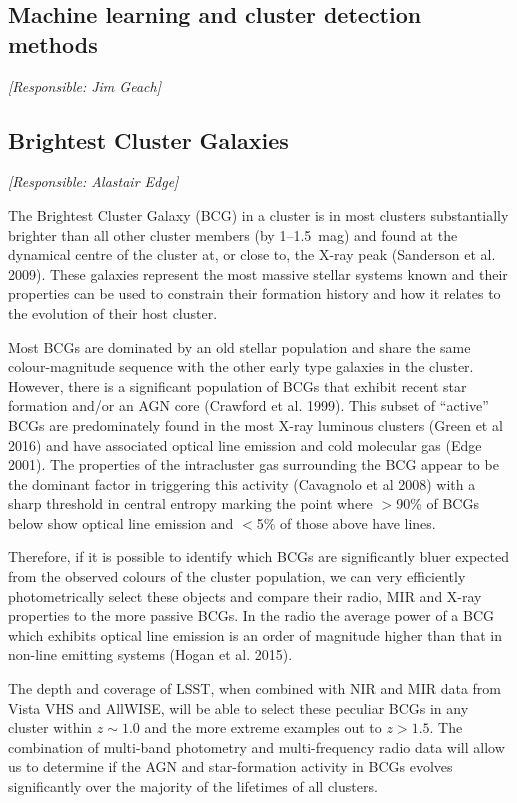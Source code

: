\documentclass[a4paper,11pt]{article}
\begin{document}
\subsection{Machine learning and cluster detection methods}

{\it [Responsible: Jim Geach]}

\subsection{Brightest Cluster Galaxies}

{\it [Responsible: Alastair Edge]}

\noindent
The Brightest Cluster Galaxy (BCG) in a cluster is in most
clusters substantially brighter than all other cluster
members (by 1--1.5~mag) and found at the dynamical centre
of the cluster at, or close to, the X-ray peak (Sanderson
et al. 2009). These galaxies represent the most massive 
stellar systems known and their properties can be used
to constrain their formation history and how it relates
to the evolution of their host cluster.

Most BCGs are dominated by an old stellar population
and share the same colour-magnitude sequence with the
other early type galaxies in the cluster. However, there
is a significant population of BCGs that exhibit recent
star formation and/or an AGN core (Crawford et al. 1999).
This subset of ``active'' BCGs are predominately found in
the most X-ray luminous clusters (Green et al 2016) and
have associated optical line emission and cold molecular
gas (Edge 2001). The properties of the intracluster gas 
surrounding the BCG appear to be the dominant factor
in triggering this activity (Cavagnolo et al 2008) with
a sharp threshold in central entropy marking the 
point where $>$90\% of BCGs below show optical line emission 
and $<$5\% of those above have lines. 

Therefore, if it is possible to identify which BCGs are
significantly bluer expected from the observed colours
of the cluster population, we can very efficiently
photometrically select these objects and compare
their radio, MIR and X-ray properties to the 
more passive BCGs. In the radio the average power
of a BCG which exhibits optical line emission is
an order of magnitude higher than that in non-line
emitting systems (Hogan et al. 2015). 

The depth and coverage of LSST, when combined
with NIR and MIR data from Vista VHS and AllWISE,
will be able to select these peculiar BCGs in
any cluster within $z\sim 1.0$ and the more
extreme examples out to $z>1.5$. The combination
of multi-band photometry and multi-frequency
radio data will allow us to determine if the 
AGN and star-formation activity in BCGs evolves
significantly over the majority of the lifetimes
of all clusters.
\end{document}
